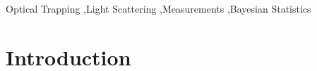 \documentclass[final,  3p]{elsarticle}
\begin{document}
\begin{frontmatter}

\begin{keyword}
	Optical Trapping \sep Light Scattering \sep Measurements \sep Bayesian Statistics 
\end{keyword}

\end{frontmatter}
\newpage

\section{Introduction}
\label{sec:Intro}
\end{document}
